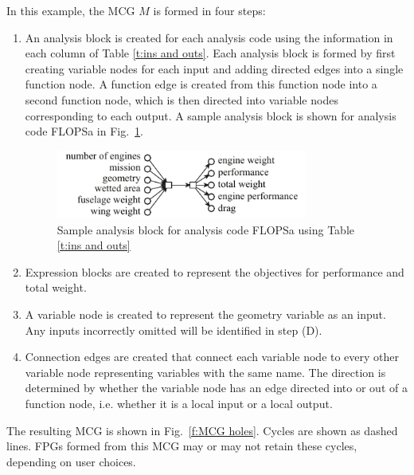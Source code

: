 	In this example, the MCG $M$ is formed in four steps:
	\begin{enumerate}
	\item An analysis block is created for each analysis code using the information in each column of Table \ref{t:ins and outs}. 
	Each analysis block is formed by first creating variable nodes for each input and adding directed edges into a single function node. 
A function edge is created from this function node into a second function node, which is then directed into variable nodes corresponding to each output. 
	A sample analysis block is shown for analysis code FLOPSa in Fig.~\ref{f:FLOPSb analysis block}.
	\begin{figure}[htb!]
	  \begin{center}
		\includegraphics[width=3.25in]{images/FLOPSa_analysis_block}
	  \end{center}
	  \caption{Sample analysis block for analysis code FLOPSa using Table \ref{t:ins and outs}}
	\label{f:FLOPSb analysis block}
	\end{figure}

	\item Expression blocks are created to represent the objectives for performance and total weight.

	\item A variable node is created to represent the geometry variable as an input. Any inputs incorrectly omitted will be identified in step (D).

	\item Connection edges are created that connect each variable node to every other variable node representing variables with the same name. 
	The direction is determined by whether the variable node has an edge directed into or out of a function node, i.e. whether it is a local input or a local output.
	\end{enumerate}
	The resulting MCG is shown in Fig.~\ref{f:MCG holes}. 
	Cycles are shown as dashed lines. FPGs formed from this MCG may or may not retain these cycles,  depending on user choices.
